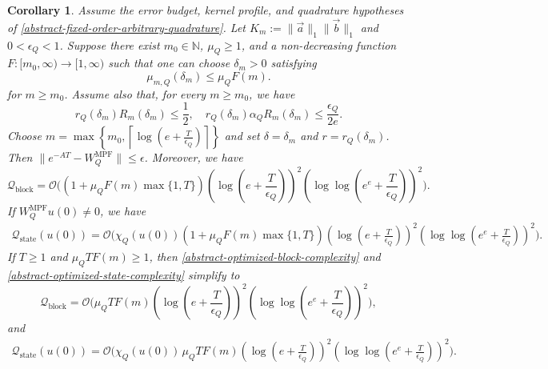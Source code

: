 \documentclass[10pt,reqno]{article}
\numberwithin{equation}{section}
\theoremstyle{plain}
\newtheorem{cor}[thm]{Corollary}
\theoremstyle{definition}
\begin{document}
\begin{cor}
\label{abstract-optimized-order-arbitrary-quadrature}
Assume the error budget, kernel profile, and quadrature hypotheses of \cref{abstract-fixed-order-arbitrary-quadrature}. Let \(K_m:=\|\vec a\|_1\|\vec b\|_1\) and \(0<\epsilon_Q<1\). Suppose there exist \(m_0\in\mathbb N\), \(\mu_Q\geq1\), and a non-decreasing function \(F:[m_0,\infty)\to[1,\infty)\) such that one can choose \(\delta_m>0\) satisfying
\begin{equation}\label{F-cond}
\mu_{m,Q}(\delta_m) \leq \mu_QF(m).
\end{equation}
for $m \geq m_0$. Assume also that, for every \(m\geq m_0\), we have
\begin{equation}
r_Q(\delta_m)R_m(\delta_m)\le \frac12, \quad r_Q(\delta_m)\alpha_QR_m(\delta_m) \le \frac{\epsilon_Q}{2e}.
\label{abstract-optimized-admissibility}
\end{equation}
Choose $m=\max\left\{m_0,\left\lceil\log\left(e+\frac{T}{\epsilon_Q}\right)\right\rceil\right\}$ and set \(\delta=\delta_m\) and \(r=r_Q(\delta_m)\). Then \(\|e^{-AT}-W_Q^{\operatorname{MPF}}\|\leq \epsilon\). Moreover, we have
\begin{equation}
\mathcal Q_{\operatorname{block}} = \mathcal O\Bigg( \left(1+\mu_QF(m)\max\{1,T\}\right) \left(\log\left(e+\frac{T}{\epsilon_Q}\right)\right)^2 \left(\log\log\left(e^e+\frac{T}{\epsilon_Q}\right)\right)^2 \Bigg).
\label{abstract-optimized-block-complexity}
\end{equation}
If \(W_Q^{\operatorname{MPF}}u(0)\neq0\), we have
\begin{align}
\mathcal Q_{\operatorname{state}}(u(0)) = \mathcal O\Bigg( \chi_Q(u(0)) \left(1+\mu_QF(m)\max\{1,T\}\right) \left(\log\left(e+\frac{T}{\epsilon_Q}\right)\right)^2 \left(\log\log\left(e^e+\frac{T}{\epsilon_Q}\right)\right)^2 \Bigg).
\label{abstract-optimized-state-complexity}
\end{align}
If \(T\geq1\) and \(\mu_QTF(m)\geq1\), then \cref{abstract-optimized-block-complexity} and \cref{abstract-optimized-state-complexity} simplify to
\begin{equation}
\mathcal Q_{\operatorname{block}} = \mathcal O\Bigg( \mu_QTF(m) \left(\log\left(e+\frac{T}{\epsilon_Q}\right)\right)^2 \left(\log\log\left(e^e+\frac{T}{\epsilon_Q}\right)\right)^2 \Bigg),
\label{abstract-optimized-block-complexity-simplified}
\end{equation}
and
\begin{align}
\mathcal Q_{\operatorname{state}}(u(0)) = \mathcal O\Bigg( \chi_Q(u(0))\,\mu_QTF(m) \left(\log\left(e+\frac{T}{\epsilon_Q}\right)\right)^2 \left(\log\log\left(e^e+\frac{T}{\epsilon_Q}\right)\right)^2 \Bigg).
\label{abstract-optimized-state-complexity-simplified}
\end{align}
\end{cor}
\end{document}
